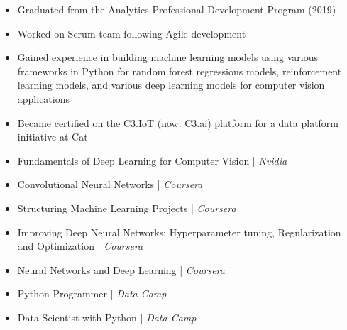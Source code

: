 \documentclass[10pt,a4paper,ragged2e,withhyper]{altacv}
\begin{document}
\begin{paracol}{2}
\divider

\begin{itemize}
\item  Graduated from the Analytics Professional Development Program (2019)
\item  Worked on Scrum team following Agile development
\item  Gained experience in building machine learning models using various frameworks in Python for random forest regressions models, reinforcement learning models, and various deep learning models for computer vision applications
\item  Became certified on the C3.IoT (now: C3.ai) platform for a data platform initiative at Cat 
\end{itemize}





\begin{itemize}
\item Fundamentals of Deep Learning for Computer Vision | \textit{Nvidia}
\item Convolutional Neural Networks | \textit{Coursera}
\item Structuring Machine Learning Projects | \textit{Coursera}
\item Improving Deep Neural Networks: Hyperparameter tuning, Regularization and Optimization | \textit{Coursera}
\item Neural Networks and Deep Learning | \textit{Coursera}
\item Python Programmer | \textit{Data Camp}
\item Data Scientist with Python | \textit{Data Camp}
\end{itemize}



\end{paracol}
\end{document}
